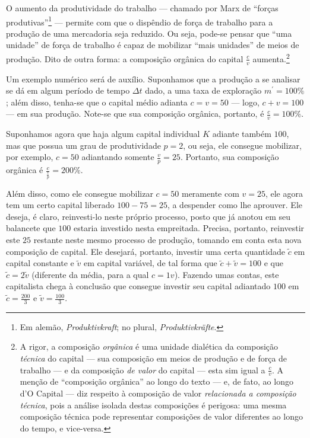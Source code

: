 O aumento da produtividade do trabalho — chamado por Marx de ``forças produtivas''\footnote{Em alemão, \textit{Produktivkraft}; no plural, \textit{Produktivkräfte}.} — permite com que o dispêndio de força de trabalho para a produção de uma mercadoria seja reduzido. Ou seja, pode-se pensar que ``uma unidade'' de força de trabalho é capaz de mobilizar ``mais unidades'' de meios de produção. Dito de outra forma: a composição orgânica do capital $\frac{c}{v}$ aumenta.\footnote{A rigor, a composição \textit{orgânica} é uma unidade dialética da composição \textit{técnica} do capital — sua composição em meios de produção e de força de trabalho — e da composição \textit{de valor} do capital — esta sim igual a $\frac{c}{v}$. A menção de ``composição orgânica'' ao longo do texto — e, de fato, ao longo d'O Capital — diz respeito à composição de valor \textit{relacionada a composição técnica}, pois a análise isolada destas composições é perigosa: uma mesma composição técnica pode representar composições de valor diferentes ao longo do tempo, e vice-versa.}

Um exemplo numérico será de auxílio. Suponhamos que a produção a se analisar se dá em algum período de tempo $\Delta t$ dado, a uma taxa de exploração $m^{\prime}=100\%$; além disso, tenha-se que o capital médio adianta $c=v=50$ — logo, $c+v=100$ — em sua produção. Note-se que sua composição orgânica, portanto, é $\frac{c}{v}=100\%$.

Suponhamos agora que haja algum capital individual $K$ adiante também $100$, mas que possua um grau de produtividade $p=2$, ou seja, ele consegue mobilizar, por exemplo, $c=50$ adiantando somente $\frac{v}{p}=25$. Portanto, sua composição orgânica é $\frac{c}{\frac{v}{p}}=200\%$. 

Além disso, como ele consegue mobilizar $c=50$ meramente com $v=25$, ele agora tem um certo capital liberado $100-75=25$, a despender como lhe aprouver. Ele deseja, é claro, reinvesti-lo neste próprio processo, posto que já anotou em seu balancete que $100$ estaria investido nesta empreitada. Precisa, portanto, reinvestir este $25$ restante neste mesmo processo de produção, tomando em conta esta nova composição de capital. Ele desejará, portanto, investir uma certa quantidade $\tilde{c}$ em capital constante e $\tilde{v}$ em capital variável, de tal forma que $\tilde{c}+\tilde{v}=100$ e que $\tilde{c} = 2 \tilde{v}$ (diferente da média, para a qual $c=1v$). Fazendo umas contas, este capitalista chega à conclusão que consegue investir seu capital adiantado $100$ em $\tilde{c}=\frac{200}{3}$ e $\tilde{v}=\frac{100}{3}$.


